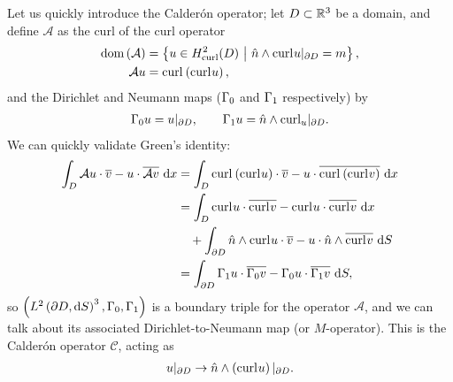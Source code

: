 Let us quickly introduce the Calder\'{o}n operator; let $D\subset\mathbb{R}^3$ be a domain, and define $\mathcal{A}$ as the curl of the curl operator
\begin{align*}
	\mathrm{dom}\left( \mathcal{A} \right) &= \left\{  u\in H^2_{\mathrm{curl}}(D) \ \middle\vert \  \hat{n}\wedge\mathrm{curl}_{}u\vert_{\partial D} = m  \right\}, \\
	\mathcal{A}u &= \mathrm{curl}_{}\left( \mathrm{curl}_{}u \right),
\end{align*}
and the Dirichlet and Neumann maps ($\Gamma_0$ and $\Gamma_1$ respectively) by
\begin{align} \label{eq:ClassicalEM-DNMaps}
	\Gamma_0 u = u\vert_{\partial D}, \qquad
	\Gamma_1 u = \hat{n}\wedge\mathrm{curl}_{u}\vert_{\partial D}.
\end{align}
We can quickly validate Green's identity:
\begin{align*}
	\int_{D} \mathcal{A}u \cdot \overline{v} - u \cdot \overline{\mathcal{A}v}  \ \mathrm{d}x
	&= \int_{D} \mathrm{curl}_{}\left( \mathrm{curl}_{}u \right)\cdot\overline{v} - u\cdot\overline{\mathrm{curl}_{}\left( \mathrm{curl}_{}v \right)}  \ \mathrm{d}x \\
	&= \int_{D} \mathrm{curl}_{}u\cdot\overline{\mathrm{curl}_{}v} - \mathrm{curl}_{}u\cdot\overline{\mathrm{curl}_{}v}  \ \mathrm{d}x \\
	&\quad + \int_{\partial D} \hat{n}\wedge\mathrm{curl}_{}u\cdot\overline{v} - u\cdot\hat{n}\wedge\overline{\mathrm{curl}_{}v}  \ \mathrm{d}S \\
	&= \int_{\partial D} \Gamma_1 u \cdot \overline{\Gamma_0 v} - \Gamma_0 u \cdot \overline{\Gamma_1 v}  \ \mathrm{d}S,
\end{align*}
so $\left( L^{2}\left( \partial D,\mathrm{d} S \right)^3, \Gamma_0, \Gamma_1 \right)$ is a boundary triple for the operator $\mathcal{A}$, and we can talk about its associated Dirichlet-to-Neumann map (or $M$-operator).
This is the Calder\'{o}n operator $\mathcal{C}$, acting as
\begin{align*}
	u\vert_{\partial D} \rightarrow \hat{n}\wedge\left( \mathrm{curl}_{}u \right)\vert_{\partial D}.
\end{align*}

